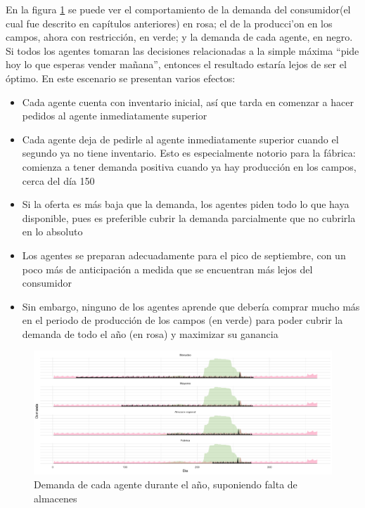 En la figura \ref{analytic_3} se puede ver el comportamiento de la demanda del consumidor(el cual fue descrito en cap\'itulos anteriores) en rosa; el de la producci'on en los campos, ahora con restricci\'on, en verde; y la demanda de cada agente, en negro. \\

Si todos los agentes tomaran las decisiones relacionadas a la simple m\'axima ``pide hoy lo que esperas vender ma\~nana'', entonces el resultado estar\'ia lejos de ser el \'optimo.
En este escenario se presentan varios efectos: 
\begin{itemize}
    \item Cada agente cuenta con inventario inicial, as\'i que tarda en comenzar a hacer pedidos al agente inmediatamente superior
    \item Cada agente deja de pedirle al agente inmediatamente superior cuando el segundo ya no tiene inventario. Esto es especialmente notorio para la f\'abrica: comienza a tener demanda positiva cuando ya hay producci\'on en los campos, cerca del d\'ia 150
    \item Si la oferta es m\'as baja que la demanda, los agentes piden todo lo que haya disponible, pues es preferible cubrir la demanda parcialmente que no cubrirla en lo absoluto
    \item Los agentes se preparan adecuadamente para el pico de septiembre, con un poco m\'as de anticipaci\'on a medida que se encuentran m\'as lejos del consumidor
    \item Sin embargo, ninguno de los agentes aprende que deber\'ia comprar mucho m\'as en el periodo de producci\'on de los campos (en verde) para poder cubrir la demanda de todo el a\~no (en rosa) y maximizar su ganancia
\end{itemize}

\begin{figure}[ht!]
\caption{Demanda de cada agente durante el a\~no, suponiendo falta de almacenes}
\label{analytic_3}
\includegraphics[width=16cm]{tesis_tex/figs/analytic_with_fields_restriction.png}
\centering
\end{figure}

